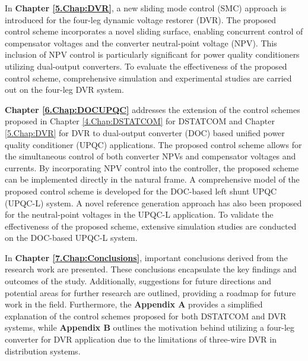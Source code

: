 In \textbf{Chapter \ref{5.Chap:DVR}}, a new sliding mode control (SMC) approach is introduced for the four-leg dynamic voltage restorer (DVR). The proposed control scheme incorporates a novel sliding surface, enabling concurrent control of compensator voltages and the converter neutral-point voltage (NPV). This inclusion of NPV control is particularly significant for power quality conditioners utilizing dual-output converters. To evaluate the effectiveness of the proposed control scheme, comprehensive simulation and experimental studies are carried out on the four-leg DVR system.

\textbf {Chapter \ref{6.Chap:DOCUPQC}} addresses the extension of the control schemes proposed in Chapter \ref{4.Chap:DSTATCOM} for DSTATCOM and Chapter \ref{5.Chap:DVR} for DVR to dual-output converter (DOC) based unified power quality conditioner (UPQC) applications. The proposed control scheme allows for the simultaneous control of both converter NPVs and compensator voltages and currents. By incorporating NPV control into the controller, the proposed scheme can be implemented directly in the natural frame. A comprehensive model of the proposed control scheme is developed for the DOC-based left shunt UPQC (UPQC-L) system. A novel reference generation approach has also been proposed for the
neutral-point voltages in the UPQC-L application. To validate the effectiveness of the proposed scheme, extensive simulation studies are conducted on the DOC-based UPQC-L system. 

In \textbf {Chapter \ref{7.Chap:Conclusions}}, important conclusions derived from the research work are presented. These conclusions encapsulate the key findings and outcomes of the study. Additionally, suggestions for future directions and potential areas for further research are outlined, providing a roadmap for future work in the field. Furthermore, the \textbf {Appendix A} %
provides a simplified explanation of the control schemes proposed for both DSTATCOM and DVR systems, while \textbf{Appendix B} outlines the motivation behind utilizing a four-leg converter for DVR application due to the limitations of three-wire DVR in distribution systems.
